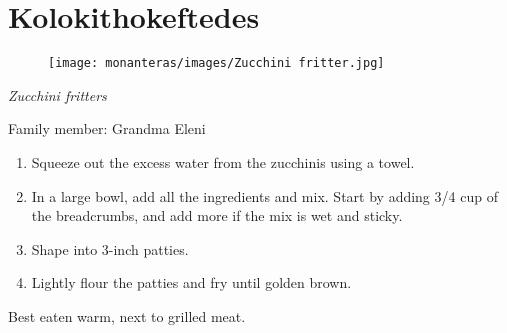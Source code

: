 \chapter{Kolokithokeftedes}
\label{ch:kolokithokeftedes}


\begin{figure}
  \texttt{[image: monanteras/images/Zucchini fritter.jpg]}
\end{figure}

\textit{Zucchini fritters}

Family member: Grandma Eleni

\begin{enumerate}
    \item Squeeze out the excess water from the zucchinis using a towel.
    \item In a large bowl, add all the ingredients and mix. Start by adding 3/4 cup of the breadcrumbs, and add more if the mix is wet and sticky.
    \item Shape into 3-inch patties.
    \item Lightly flour the patties and fry until golden brown.
\end{enumerate}

Best eaten warm, next to grilled meat.


